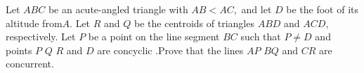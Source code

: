Let $ABC$ be an acute-angled  triangle with $AB<AC,$  and let $D$ be the foot of its altitude from$A.$ Let $R$ and $Q$ be the centroids of  triangles $ABD$ and $ACD$,  respectively. Let $P$ be a point on the line segment $BC$ such that $P \neq D$ and points $P$ $Q$ $R$ and $D$ are concyclic .Prove that the lines $AP$ $BQ$ and $CR$  are concurrent.